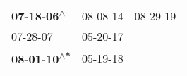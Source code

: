 \begin{supertabular}{lll}
  \textbf{07-18-06\textsuperscript{$\wedge$}} &  08-08-14\textsuperscript{} &  08-29-19\textsuperscript{} \\
                   07-28-07\textsuperscript{} &  05-20-17\textsuperscript{} &                             \\
 \textbf{08-01-10\textsuperscript{$\wedge$*}} &  05-19-18\textsuperscript{} &                             \\
\end{supertabular}
